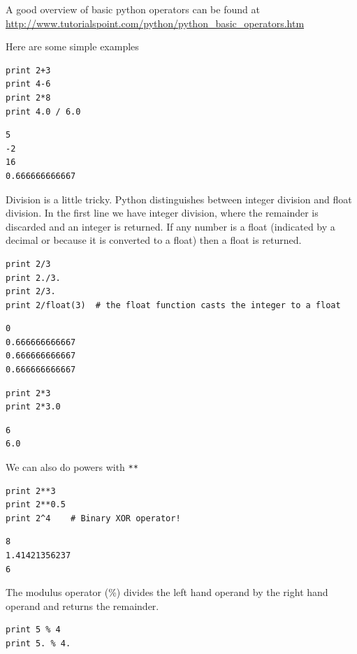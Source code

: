 \documentclass[11pt]{article}
\begin{document}
A good overview of basic python operators can be found at \url{http://www.tutorialspoint.com/python/python_basic_operators.htm}

Here are some simple examples
\begin{verbatim}
print 2+3
print 4-6
print 2*8
print 4.0 / 6.0
\end{verbatim}

\begin{verbatim}
5
-2
16
0.666666666667
\end{verbatim}


Division is a little tricky. Python distinguishes between integer division and float division. In the first line we have integer division, where the remainder is discarded and an integer is returned. If any number is a float (indicated by a decimal or because it is converted to a float) then a float is returned.

\begin{verbatim}
print 2/3
print 2./3.
print 2/3.
print 2/float(3)  # the float function casts the integer to a float
\end{verbatim}

\begin{verbatim}
0
0.666666666667
0.666666666667
0.666666666667
\end{verbatim}

\begin{verbatim}
print 2*3
print 2*3.0
\end{verbatim}

\begin{verbatim}
6
6.0
\end{verbatim}

We can also do powers with \texttt{**}

\begin{verbatim}
print 2**3
print 2**0.5
print 2^4    # Binary XOR operator!
\end{verbatim}

\begin{verbatim}
8
1.41421356237
6
\end{verbatim}

The modulus operator (\%) divides the left hand operand by the right hand operand and returns the remainder.

\begin{verbatim}
print 5 % 4
print 5. % 4.
\end{verbatim}
\end{document}
